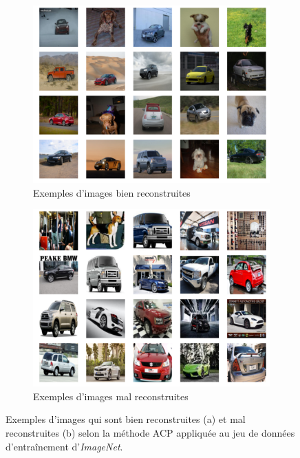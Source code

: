 \begin{figure}[H]
	\centering
	\begin{subfigure}{12cm}
		\centering\includegraphics[width=12cm]{images/smallest_errors}
		\caption{Exemples d'images bien reconstruites}
		\label{fig:acp_reconstructionsa}
	\end{subfigure}
	\begin{subfigure}{12cm}
		\centering\includegraphics[width=12cm]{images/biggest_errors}
		\caption{Exemples d'images mal reconstruites}
		\label{fig:acp_reconstructionsb}
	\end{subfigure}
	\caption{Exemples d'images qui sont bien reconstruites (a) et mal reconstruites (b) selon la méthode ACP appliquée au jeu de données d'entraînement d'\textit{ImageNet}.}
	\label{fig:acp_reconstructions}
\end{figure}

